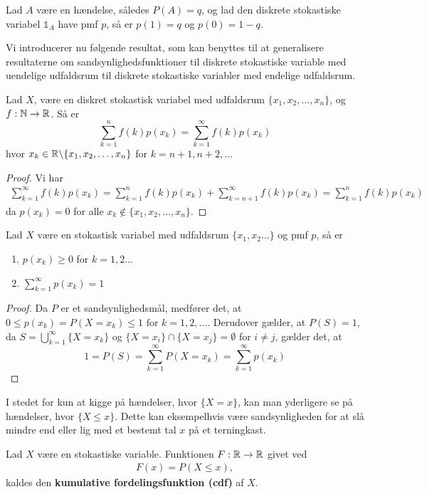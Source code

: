 \begin{example}
  Lad $A$ være en hændelse, således $P(A) = q$, og lad den diskrete stokastiske variabel $\mathbb{1}_{A}$ have pmf $p$, så er $p(1) = q$ og $p(0) = 1 - q$.
\end{example}
Vi introducerer nu følgende resultat, som kan benyttes til at generalisere resultaterne om sandsynlighedsfunktioner til diskrete stokastiske variable med uendelige udfaldsrum til diskrete stokastiske variabler med endelige udfaldsrum.
\begin{lem}
Lad $X$, være en diskret stokastisk variabel med udfaldsrum $\{x_1, x_2, \ldots, x_n\}$, og $f: \mathbb{N} \to \mathbb{R}$. Så er 
\begin{equation*}
    \sum^n_{k = 1} f(k) p(x_k) = \sum^\infty_{k = 1} f(k) p(x_k)
\end{equation*}
hvor $x_k \in \mathbb{R} \backslash \{x_1, x_2, \ldots, x_n\}$ for $k = n + 1, n + 2, \ldots$
\end{lem}
\begin{proof}
Vi har 
\begin{align*}
    \sum^\infty_{k = 1} f(k) p(x_k) =\sum^n_{k = 1} f(k) p(x_k) + \sum^\infty_{k = n + 1} f(k) p(x_k) = \sum^n_{k = 1} f(k) p(x_k) 
\end{align*}
da $p(x_k) = 0$ for alle $x_k \not \in \{x_1, x_2, \ldots, x_n\}$.
\end{proof}

\begin{prop}\label{prop:kravTilPMF}\label{prop:pmfEgenskaber} %
Lad $X$ være en stokastisk variabel med udfaldsrum $\{x_1, x_2\ldots\}$ og pmf $p$, så er 
\begin{enumerate}
    \item $p(x_k) \geq 0$ for $k=1,2 \ldots$
    \item $\displaystyle \sum_{k=1}^{\infty} p(x_k) = 1 $
\end{enumerate}
\end{prop}
\begin{proof}
Da $P$ er et sandsynlighedsmål, medfører det, at $0 \leq p(x_k) = P(X = x_k) \leq 1 \text{ for } k=1,2,\ldots$. Derudover gælder, at $P(S)=1$, da $S = \bigcup^\infty_{k = 1} \{X=x_k\}$ og $\{X=x_i\} \cap \{X=x_j\} = \emptyset$ for $i \neq j$, gælder det, at
\begin{equation*}
    1 = P(S) = \sum^\infty_{k = 1} P(X=x_k) = \sum_{k=1}^\infty p(x_k)
\end{equation*}
\end{proof}
I stedet for kun at kigge på hændelser, hvor $\{ X=x \}$, kan man yderligere se på hændelser, hvor $\{X \leq x \}$. Dette kan eksempelhvis være sandsynligheden for at slå mindre end eller lig med et bestemt tal $x$ på et terningkast. 
\begin{defn} %
Lad $X$ være en stokastiske variable. Funktionen $F: \mathbb{R} \to \mathbb{R}$ givet ved
\begin{align*}
    F(x)=P(X\leq x), 
\end{align*}
kaldes den \textbf{kumulative fordelingsfunktion (cdf)} af $X$.
\end{defn}

